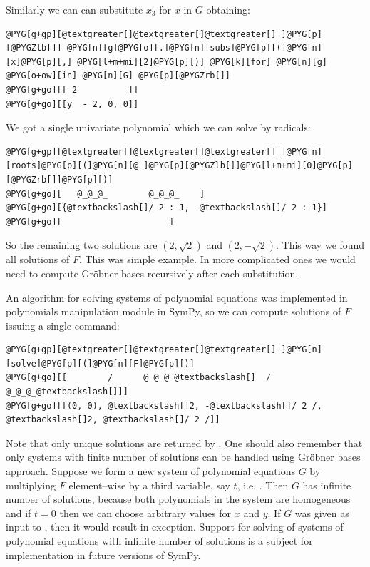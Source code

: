 Similarly we can can substitute $x_3$ for $x$ in $G$ obtaining:

\begin{Verbatim}[commandchars=@\[\]]
@PYG[g+gp][@textgreater[]@textgreater[]@textgreater[] ]@PYG[p][@PYGZlb[]] @PYG[n][g]@PYG[o][.]@PYG[n][subs]@PYG[p][(]@PYG[n][x]@PYG[p][,] @PYG[l+m+mi][2]@PYG[p][)] @PYG[k][for] @PYG[n][g] @PYG[o+ow][in] @PYG[n][G] @PYG[p][@PYGZrb[]]
@PYG[g+go][[ 2          ]]
@PYG[g+go][[y  - 2, 0, 0]]
\end{Verbatim}
\noindent
We got a single univariate polynomial which we can solve by radicals:

\begin{Verbatim}[commandchars=@\[\]]
@PYG[g+gp][@textgreater[]@textgreater[]@textgreater[] ]@PYG[n][roots]@PYG[p][(]@PYG[n][@_]@PYG[p][@PYGZlb[]]@PYG[l+m+mi][0]@PYG[p][@PYGZrb[]]@PYG[p][)]
@PYG[g+go][   @_@_@_        @_@_@_    ]
@PYG[g+go][{@textbackslash[]/ 2 : 1, -@textbackslash[]/ 2 : 1}]
@PYG[g+go][                     ]
\end{Verbatim}
\noindent
So the remaining two solutions are $(2, \sqrt{2})$ and $(2, -\sqrt{2})$. This way we found
all solutions of $F$. This was simple example. In more complicated ones we would need to
compute Gröbner bases recursively after each substitution.

An algorithm for solving systems of polynomial equations was implemented in polynomials
manipulation module in SymPy, so we can compute solutions of $F$ issuing a single command:

\begin{Verbatim}[commandchars=@\[\]]
@PYG[g+gp][@textgreater[]@textgreater[]@textgreater[] ]@PYG[n][solve]@PYG[p][(]@PYG[n][F]@PYG[p][)]
@PYG[g+go][[        /      @_@_@_@textbackslash[]  /     @_@_@_@textbackslash[]]]
@PYG[g+go][[(0, 0), @textbackslash[]2, -@textbackslash[]/ 2 /, @textbackslash[]2, @textbackslash[]/ 2 /]]
\end{Verbatim}
\noindent
Note that only unique solutions are returned by . One should also remember that
only systems with finite number of solutions can be handled using Gröbner bases approach.
Suppose we form a new system of polynomial equations $G$ by multiplying $F$ element--wise by
a third variable, say $t$, i.e. . Then $G$ has infinite number of
solutions, because both polynomials in the system are homogeneous and if $t = 0$ then we can
choose arbitrary values for $x$ and $y$. If $G$ was given as input to , then it
would result in \href{http://docs.python.org/library/exceptions.html\#exceptions.NotImplementedError}{} exception. Support for solving of systems of
polynomial equations with infinite number of solutions is a subject for implementation
in future versions of SymPy.

